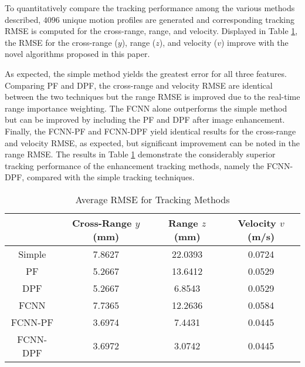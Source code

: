 \documentclass[10pt,journal,final]{IEEEtran}
\begin{document}
To quantitatively compare the tracking performance among the various methods described, $4096$ unique motion profiles are generated and corresponding tracking RMSE is computed for the cross-range, range, and velocity. Displayed in Table \ref{table:tracking_rmse2}, the RMSE for the cross-range ($y$), range ($z$), and velocity ($v$) improve with the novel algorithms proposed in this paper. 

As expected, the simple method yields the greatest error for all three features. Comparing PF and DPF, the cross-range and velocity RMSE are identical between the two techniques but the range RMSE is improved due to the real-time range importance weighting. The FCNN alone outperforms the simple method but can be improved by including the PF and DPF after image enhancement. Finally, the FCNN-PF and FCNN-DPF yield identical results for the cross-range and velocity RMSE, as expected, but significant improvement can be noted in the range RMSE. The results in Table \ref{table:tracking_rmse2} demonstrate the considerably superior tracking performance of the enhancement tracking methods, namely the FCNN-DPF, compared with the simple tracking techniques.

\begin{table} [h]
	\caption{Average RMSE for Tracking Methods}
	\centering
	\begin{tabular}{c || c c c}
		\hline
		& Cross-Range $y$ (mm) & Range $z$ (mm) & Velocity $v$ (m/s) \\
		\hline\hline
		Simple & 7.8627 & 22.0393 & 0.0724 \\
		\hline
		PF & 5.2667 & 13.6412 & 0.0529 \\
		\hline
		DPF & 5.2667 & 6.8543 & 0.0529 \\
		\hline
		FCNN & 7.7365 & 12.2636 & 0.0584 \\
		\hline
		FCNN-PF & 3.6974 & 7.4431 & 0.0445 \\
		\hline
		FCNN-DPF & 3.6972 & 3.0742 & 0.0445 \\
		\hline
	\end{tabular}
\label{table:tracking_rmse2}
\end{table}
\end{document}
